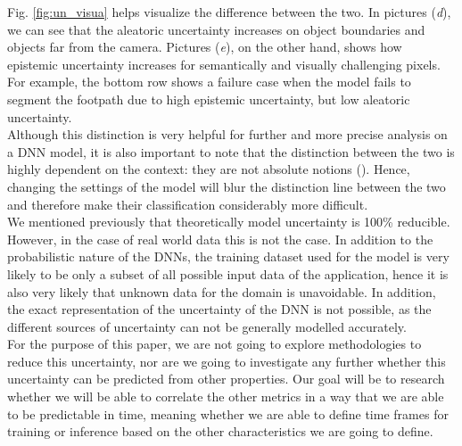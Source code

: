 Fig. \ref{fig:un_visua} helps visualize the difference between the two. In pictures (\textit{d}), we can see that the aleatoric uncertainty increases on object boundaries and objects far from the camera. Pictures (\textit{e}), on the other hand, shows how epistemic uncertainty increases for semantically and visually challenging pixels. For example, the bottom row shows a failure case when the model fails to segment the footpath due to high epistemic uncertainty, but low aleatoric uncertainty. \cite{DBLP:journals/corr/KendallG17}\\
Although this distinction is very helpful for further and more precise analysis on a DNN model, it is also important to note that the distinction between the two is highly dependent on the context: they are not absolute notions (\cite{KIUREGHIAN2009105}). Hence, changing the settings of the model will blur the distinction line between the two and therefore make their classification considerably more difficult. \cite{Separation_uncer}\\
We mentioned previously that theoretically model uncertainty is 100\% reducible. However, in the case of real world data this is not the case. In addition to the probabilistic nature of the DNNs, the training dataset used for the model is very likely to be only a subset of all possible input data of the application, hence it is also very likely that unknown data for the domain is unavoidable. In addition, the exact representation of the uncertainty of the DNN is not possible, as the different sources of uncertainty can not be generally modelled accurately. \cite{gawlikowski2021survey}\\

For the purpose of this paper, we are not going to explore methodologies to reduce this uncertainty, nor are we going to investigate any further whether this uncertainty can be predicted from other properties. Our goal will be to research whether we will be able to correlate the other metrics in a way that we are able to be predictable in time, meaning whether we are able to define time frames for training or inference based on the other characteristics we are going to define. 

